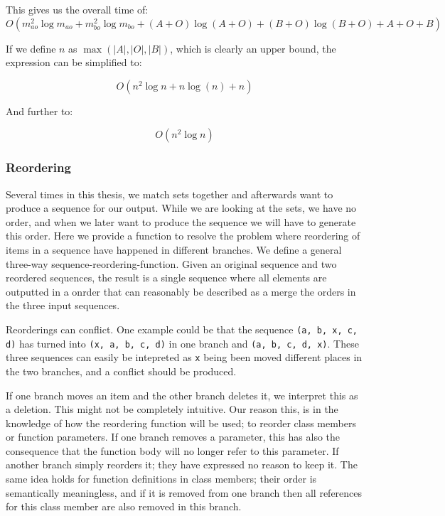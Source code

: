 \documentclass[11pt]{article}
\begin{document}
This gives us the overall time of:
\begin{equation}
O(m_{ao}^2 \log m_{ao} + m_{bo}^2 \log m_{bo} + (A+O) \log (A+O) + (B+O) \log (B+O) + A + O + B) \nonumber
\end{equation}

If we define $n$ as $\max(|A|, |O|, |B|)$, which is clearly an upper bound, the expression can be simplified to:

\begin{equation}
O(n^2 \log n + n \log (n) + n) \nonumber
\end{equation}

And further to:

\begin{equation}
O(n^2 \log n) \nonumber
\end{equation}

\subsubsection{Reordering}
\label{ThreeWayReorderingAlgorithmSec}
Several times in this thesis, we match sets together and afterwards want to produce a sequence for our output. While we are looking at the sets, we have no order, and when we later want to produce the sequence we will have to generate this order. Here we provide a function to resolve the problem where reordering of items in a sequence have happened in different branches. We define a general three-way sequence-reordering-function. Given an original sequence and two reordered sequences, the result is a single sequence where all elements are outputted in a onrder that can reasonably be described as a merge the orders in the three input sequences.

Reorderings can conflict. One example could be that the sequence \texttt{(a, b, x, c, d)} has turned into \texttt{(x, a, b, c, d)} in one branch and \texttt{(a, b, c, d, x)}. These three sequences can easily be intepreted as \texttt{x} being been moved different places in the two branches, and a conflict should be produced.

If one branch moves an item and the other branch deletes it, we interpret this as a deletion. This might not be completely intuitive. Our reason this, is in the knowledge of how the reordering function will be used; to reorder class members or function parameters. If one branch removes a parameter, this has also the consequence that the function body will no longer refer to this parameter. If another branch simply reorders it; they have expressed no reason to keep it. The same idea holds for function definitions in class members; their order is semantically meaningless, and if it is removed from one branch then all references for this class member are also removed in this branch.
\end{document}
